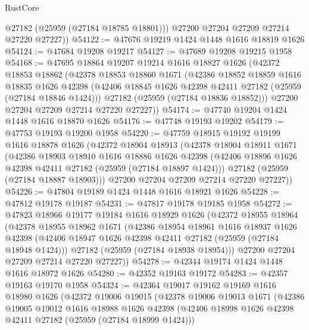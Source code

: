 \begin{lexlean}{RustCore}
\begin{coremodule}
          @27182
          (@25959 (@27184 @18785 @18801)))
        @27200
        @27204
        @27209
        @27214
        @27220
        @27227))
@54122 := @47676 @19219 @1424 @1448 @1616 @18819 @1626
@54124 := @47684 @19208 @19217
@54127 := @47689 @19208 @19215 @1958
@54168 := @47695
    @18864
    @19207
    @19214
    @1616
    @18827
    @1626
    (@42372
      @18853
      @18862
      (@42378
        @18853
        @18860
        @1671
        (@42386
          @18852
          @18859
          @1616
          @18835
          @1626
          @42398
          (@42406 @18845 @1626 @42398 @42411 @27182 (@25959 (@27184 @18846 @1424)))
          @27182
          (@25959 (@27184 @18836 @18852)))
        @27200
        @27204
        @27209
        @27214
        @27220
        @27227))
@54174 := @47740 @19204 @1424 @1448 @1616 @18870 @1626
@54176 := @47748 @19193 @19202
@54179 := @47753 @19193 @19200 @1958
@54220 := @47759
    @18915
    @19192
    @19199
    @1616
    @18878
    @1626
    (@42372
      @18904
      @18913
      (@42378
        @18904
        @18911
        @1671
        (@42386
          @18903
          @18910
          @1616
          @18886
          @1626
          @42398
          (@42406 @18896 @1626 @42398 @42411 @27182 (@25959 (@27184 @18897 @1424)))
          @27182
          (@25959 (@27184 @18887 @18903)))
        @27200
        @27204
        @27209
        @27214
        @27220
        @27227))
@54226 := @47804 @19189 @1424 @1448 @1616 @18921 @1626
@54228 := @47812 @19178 @19187
@54231 := @47817 @19178 @19185 @1958
@54272 := @47823
    @18966
    @19177
    @19184
    @1616
    @18929
    @1626
    (@42372
      @18955
      @18964
      (@42378
        @18955
        @18962
        @1671
        (@42386
          @18954
          @18961
          @1616
          @18937
          @1626
          @42398
          (@42406 @18947 @1626 @42398 @42411 @27182 (@25959 (@27184 @18948 @1424)))
          @27182
          (@25959 (@27184 @18938 @18954)))
        @27200
        @27204
        @27209
        @27214
        @27220
        @27227))
@54278 := @42344 @19174 @1424 @1448 @1616 @18972 @1626
@54280 := @42352 @19163 @19172
@54283 := @42357 @19163 @19170 @1958
@54324 := @42364
    @19017
    @19162
    @19169
    @1616
    @18980
    @1626
    (@42372
      @19006
      @19015
      (@42378
        @19006
        @19013
        @1671
        (@42386
          @19005
          @19012
          @1616
          @18988
          @1626
          @42398
          (@42406 @18998 @1626 @42398 @42411 @27182 (@25959 (@27184 @18999 @1424)))

\end{coremodule}
\end{lexlean}
